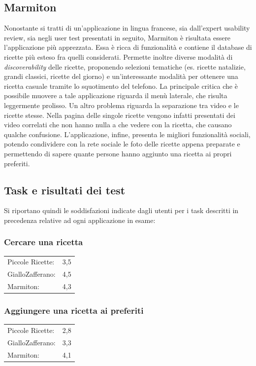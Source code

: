 \subsection{Marmiton}
Nonostante si tratti di un'applicazione in lingua francese, sia dall'expert
usability review, sia negli user test presentati in seguito, Marmiton è
risultata essere l'applicazione più apprezzata.  Essa è ricca di funzionalità e
contiene il database di ricette più esteso fra quelli considerati.  Permette
inoltre diverse modalità di \emph{discoverability} delle ricette, proponendo
selezioni tematiche (es. ricette natalizie, grandi classici, ricette del giorno)
e un'interessante modalità per ottenere una ricetta casuale tramite lo
squotimento del telefono.  La principale critica che è possibile muovere a tale
applicazione riguarda il menù laterale, che risulta leggermente prolisso. Un
altro problema riguarda la separazione tra video e le ricette stesse.  Nella
pagina delle singole ricette vengono infatti presentati dei video correlati che
non hanno nulla a che vedere con la ricetta, che causano qualche confusione.
L'applicazione, infine, presenta le migliori funzionalità sociali, potendo
condividere con la rete sociale le foto delle ricette appena preparate e
permettendo di sapere quante persone hanno aggiunto una ricetta ai propri
preferiti.



\subsection{Task e risultati dei test}
Si riportano quindi le soddisfazioni indicate dagli utenti
per i task descritti in precedenza relative ad ogni applicazione in esame:

\subsubsection{Cercare una ricetta}
\begin{tabular}{l c}
Piccole Ricette: & 3,5\\
GialloZafferano: & 4,5\\
Marmiton: & 4,3\\
\end{tabular}

\subsubsection{Aggiungere una ricetta ai preferiti}
\begin{tabular}{l c}
Piccole Ricette: & 2,8\\
GialloZafferano: & 3,3\\
Marmiton: & 4,1\\
\end{tabular}


